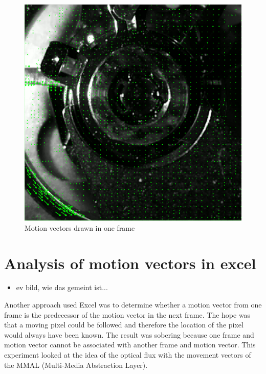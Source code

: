 \documentclass[12pt, a4paper]{report}
\begin{document}
    \noindent
    \begin{figure}[H]
    \centering
    \includegraphics[scale=0.5]{Images/motion_vectors.png}
    
    \caption{Motion vectors drawn in one frame}
    \end{figure}
    
    \section{Analysis of motion vectors in excel}
    \begin{itemize}
        \item ev bild, wie das gemeint ist...
      \end{itemize}
    Another approach used Excel was to determine whether a motion vector from one frame is the predecessor of the motion vector in the next frame.
    The hope was that a moving pixel could be followed and therefore the location of the pixel would always have been known.
    The result was sobering because one frame and motion vector cannot be associated with another frame and motion vector.
    This experiment looked at the idea of the optical flux with the movement vectors of the MMAL (Multi-Media Abstraction Layer).
    
\end{document}
